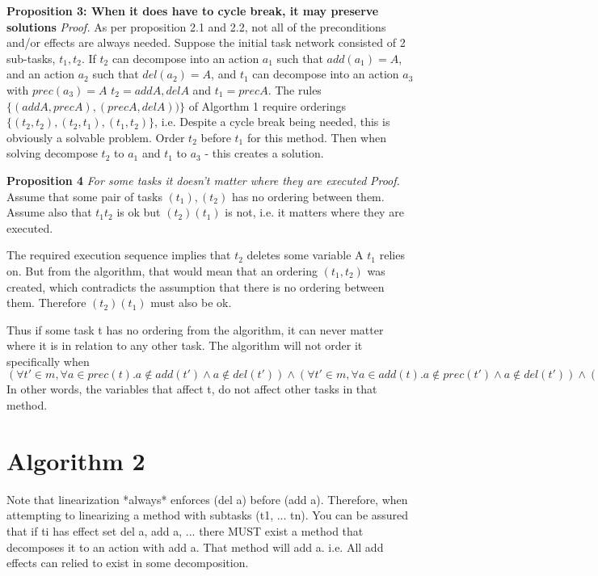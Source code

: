 \textbf{Proposition 3: When it does have to cycle break, it may preserve solutions} \newline
\textit{Proof.}
As per proposition 2.1 and 2.2, not all of the preconditions and/or effects are always needed. Suppose the initial task network consisted of 2 sub-tasks, $t_1, t_2$. If $t_2$ can decompose into an action $a_1$ such that $add(a_1) = A$, and an action $a_2$ such that $del(a_2) = A$,
and $t_1$ can decompose into an action $a_3$ with $prec(a_3) = A$
$t_2 = {add A, del A}$ and $t_1 = {prec A}$. The rules $\{(add A, prec A), (prec A, del A))\}$ of Algorthm 1
require orderings $\{(t_2, t_2), (t_2, t_1), (t_1, t_2)\}$, i.e.
Despite a cycle break being needed, this is obviously a solvable problem. Order $t_2$ before $t_1$ for this method.
Then when solving decompose $t_2$ to $a_1$ and $t_1$ to $a_3$ - this creates a solution.


\textbf{Proposition 4} \textit{For some tasks it doesn't matter where they are executed} \newline
\textit{Proof.}
Assume that some pair of tasks $(t_1), (t_2)$ has no ordering between them. Assume also that $t_1 t_2$ is ok but $(t_2) (t_1)$ is not, i.e.
it matters where they are executed.

The required execution sequence implies that $t_2$ deletes some variable A $t_1$ relies on. But from the algorithm,
that would mean that an ordering $(t_1, t_2)$ was created, which contradicts the assumption that there is no ordering between them.
Therefore $(t_2)(t_1)$ must also be ok. 
 
Thus if some task t has no ordering from the algorithm, it can never matter where it is in relation to any other task.
The algorithm will not order it specifically when $(\forall t' \in m, \forall a \in prec(t). a \notin add(t') \land a \notin del(t'))
\land  (\forall t' \in m, \forall a \in add(t). a \notin prec(t') \land a \notin del(t')) 
\land  (\forall t' \in m, \forall a \in del(t). a \notin add(t') \land a \notin prec(t'))$
In other words, the variables that affect t, do not affect other tasks in that method.



\section{Algorithm 2}
Note that linearization *always* enforces (del a) before (add a).
Therefore, when attempting to linearizing a method with subtasks (t1, ... tn).
You can be assured that if ti has effect set {del a, add a, ...} there MUST exist a method that
decomposes it to an action with add a. That method will add a. i.e. All add effects can relied to exist in some decomposition.

